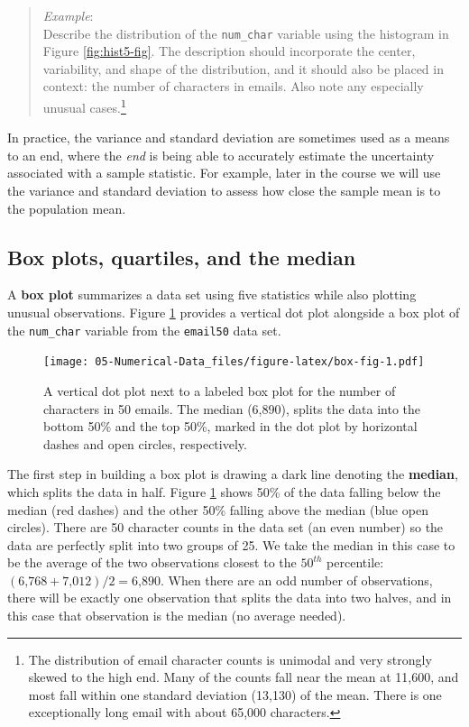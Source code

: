 \documentclass[
]{book}
\begin{document}
\begin{quote}
\emph{Example}:\\
Describe the distribution of the \texttt{num\_char} variable using the histogram in Figure \ref{fig:hist5-fig}. The description should incorporate the center, variability, and shape of the distribution, and it should also be placed in context: the number of characters in emails. Also note any especially unusual cases.\footnote{The distribution of email character counts is unimodal and very strongly skewed to the high end. Many of the counts fall near the mean at 11,600, and most fall within one standard deviation (13,130) of the mean. There is one exceptionally long email with about 65,000 characters.}
\end{quote}

In practice, the variance and standard deviation are sometimes used as a means to an end, where the \emph{end} is being able to accurately estimate the uncertainty associated with a sample statistic. For example, later in the course we will use the variance and standard deviation to assess how close the sample mean is to the population mean.

\hypertarget{box-plots-quartiles-and-the-median}{%
\subsection{Box plots, quartiles, and the median}\label{box-plots-quartiles-and-the-median}}

A \textbf{box plot} summarizes a data set using five statistics while also plotting unusual observations. Figure \ref{fig:box-fig} provides a vertical dot plot alongside a box plot of the \texttt{num\_char} variable from the \texttt{email50} data set.

\begin{figure}
\centering
\texttt{[image: 05-Numerical-Data\_files/figure-latex/box-fig-1.pdf]}
\caption{\label{fig:box-fig}A vertical dot plot next to a labeled box plot for the number of characters in 50 emails. The median (6,890), splits the data into the bottom 50\% and the top 50\%, marked in the dot plot by horizontal dashes and open circles, respectively.}
\end{figure}

The first step in building a box plot is drawing a dark line denoting the \textbf{median}, which splits the data in half. Figure \ref{fig:box-fig} shows 50\% of the data falling below the median (red dashes) and the other 50\% falling above the median (blue open circles). There are 50 character counts in the data set (an even number) so the data are perfectly split into two groups of 25. We take the median in this case to be the average of the two observations closest to the \(50^{th}\) percentile: \((\text{6,768} + \text{7,012}) / 2 = \text{6,890}\). When there are an odd number of observations, there will be exactly one observation that splits the data into two halves, and in this case that observation is the median (no average needed).
\end{document}

